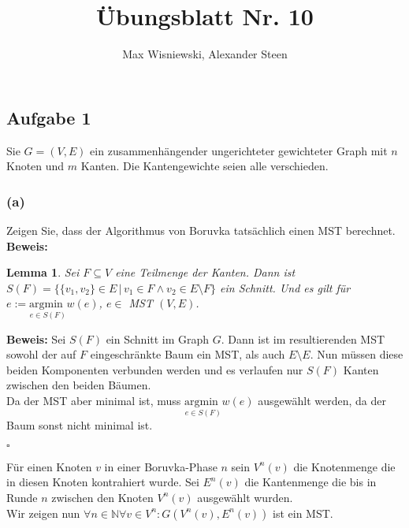 \documentclass[11pt,a4paper,ngerman]{article}
\date{}
\title{Übungsblatt Nr. 10}
\author{Max Wisniewski, Alexander Steen}
\newtheorem{lemma}{\bfseries Lemma}
\begin{document}
\renewcommand{\figurename}{Figure}
\maketitle
\thispagestyle{fancy}

    
\subsection*{Aufgabe 1}

Sie $G=(V,E)$ ein zusammenhängender ungerichteter gewichteter Graph mit $n$ Knoten und $m$ Kanten. Die Kantengewichte seien alle verschieden.

\subsubsection*{(a)}
Zeigen Sie, dass der Algorithmus von Boruvka tatsächlich einen MST berechnet.\\

\textbf{Beweis:}\\

\begin{lemma} Sei $F \subseteq V$ eine Teilmenge der Kanten. Dann ist
    $S(F) = \{ \{ v_1, v_2 \} \in E \, | \, v_1 \in F \land v_2 \in E \setminus F \}$ ein Schnitt. Und es gilt für
    $e := \underset{e \in S(F)}{\text{argmin }} w(e)$,
    $e \in$ MST $(V,E)$.\\
\end{lemma}

\textbf{Beweis:}
    Sei $S(F)$ ein Schnitt im Graph $G$. Dann ist im resultierenden
    MST sowohl der auf $F$ eingeschränkte Baum ein MST, als auch 
    $E \setminus E$. Nun müssen diese beiden Komponenten verbunden werden
    und es verlaufen nur $S(F)$ Kanten zwischen den beiden Bäumen.\\
    Da der MST aber minimal ist, muss 
    $\underset{e \in S(F)}{\text{argmin }} w(e)$ ausgewählt werden,
    da der Baum sonst nicht minimal ist.

\mbox{}\hfill$\square$

Für einen Knoten $v$ in einer Boruvka-Phase $n$ sein $V^n(v)$ die
Knotenmenge die in diesen Knoten kontrahiert wurde. Sei $E^n(v)$ die
Kantenmenge die bis in Runde $n$ zwischen den Knoten $V^n(v)$ ausgewählt
wurden.\\

Wir zeigen nun $\forall n \in \mathbb{N} \forall v \in V^n: G(V^n(v), E^n(v))$ ist ein MST.\\
\end{document}
